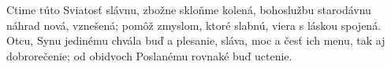Ctime túto Sviatosť slávnu, zbožne skloňme kolená, 
bohoslužbu starodávnu náhrad nová,
vznešená; pomôž zmyslom, ktoré slabnú, viera s láskou spojená. 
\versseparator
Otcu, Synu jedinému chvála buď a plesanie,   
sláva, moc a česť ich menu, tak aj dobrorečenie; 
od obidvoch Poslanému rovnaké buď uctenie.